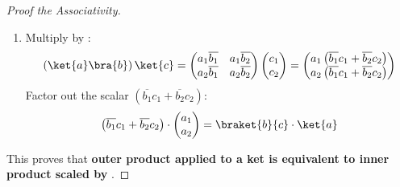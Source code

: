 \begin{proof}[Proof the Associativity]
\begin{enumerate}
        \item Multiply  by :
        \begin{equation*}
            \left(\ket{a}\bra{b}\right) \ket{c} =
            \begin{pmatrix}
                a_{1}\overline{b_{1}} & a_{1}\overline{b_{2}} \\
                a_{2}\overline{b_{1}} & a_{2}\overline{b_{2}}
            \end{pmatrix}
            \begin{pmatrix}
                c_{1} \\
                c_{2}
            \end{pmatrix}
            =
            \begin{pmatrix}
                a_{1}\left( \overline{b_{1}} c_{1} + \overline{b_{2}} c_{2} \right) \\
                a_{2}\left( \overline{b_{1}} c_{1} + \overline{b_{2}} c_{2} \right)
            \end{pmatrix}
        \end{equation*}
        Factor out the scalar $\left( \overline{b_{1}} c_{1} + \overline{b_{2}} c_{2} \right)$:
        \begin{equation*}
            \left( \overline{b_{1}} c_{1} + \overline{b_{2}} c_{2} \right) \cdot
            \begin{pmatrix}
                a_{1} \\
                a_{2}
            \end{pmatrix}
            =
            \braket{b}{c} \cdot \ket{a}
        \end{equation*}
    \end{enumerate}
    This proves that \textbf{outer product applied to a ket is equivalent to inner product  scaled by }.
\end{proof}

